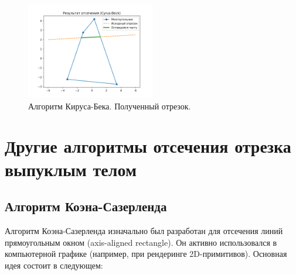 \documentclass[areasetadvanced]{scrartcl}
\begin{document}
\begin{figure}[H]
    \centering
    \includegraphics[width=0.5\textwidth]{../images/step3_clipped_result.png}
    \caption{Алгоритм Кируса-Бека. Полученный отрезок.}
    \label{fig:clipped}
\end{figure}
\newpage
\section{Другие алгоритмы отсечения отрезка выпуклым телом}
\subsection{Алгоритм Коэна-Сазерленда}
Алгоритм Коэна-Сазерленда изначально был разработан для отсечения линий 
прямоугольным окном (axis-aligned rectangle). Он активно использовался 
в компьютерной графике (например, при рендеринге 2D-примитивов). 
Основная идея состоит в следующем:
\end{document}
